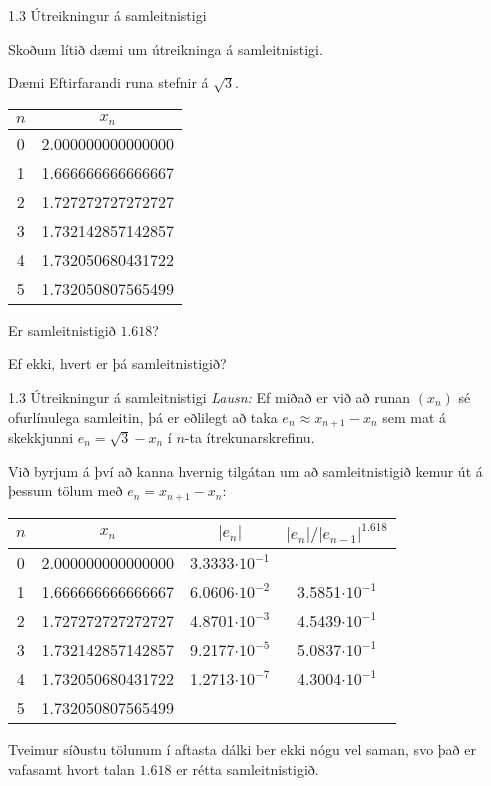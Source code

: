 \begin{frame}{1.3 Útreikningur á samleitnistigi} 

Skoðum lítið dæmi um útreikninga á samleitnistigi. 

\begin{block}{Dæmi}
Eftirfarandi runa stefnir á  $\sqrt 3$. 
\begin{center}
	\begin{tabular}{c|c|}
		$n$ & $x_n$ \\ \hline
		0&  2.000000000000000 \\
		1&  1.666666666666667 \\
		2&  1.727272727272727 \\
		3&  1.732142857142857 \\
		4&  1.732050680431722 \\
		5&  1.732050807565499 \\
	\end{tabular}
\end{center}
\pause

Er samleitnistigið $1.618$?

Ef ekki, hvert er þá samleitnistigið?
\end{block}
\end{frame}
%

%
\begin{frame}{1.3 Útreikningur á samleitnistigi} 
{\it Lausn:} Ef miðað er við að  runan $(x_n)$ sé  ofurlínulega
samleitin, þá er eðlilegt að taka $e_n\approx x_{n+1}-x_n$ sem mat á
skekkjunni $e_n=\sqrt 3-x_n$ í $n$-ta  
ítrekunarskrefinu. 

\pause

\smallskip
Við byrjum á því að kanna hvernig tilgátan
um að samleitnistigið kemur út á þessum tölum með $e_n=x_{n+1}-x_n$:
\begin{center}
\begin{tabular}{c|c|c|c|}
$n$ & $x_n$ & $|e_n|$ & $|e_n|/|e_{n-1}|^{1.618}$  \\ \hline
0&  2.000000000000000 & 3.3333$\cdot 10^{-1}$ & \\
1&  1.666666666666667 & 6.0606$\cdot 10^{-2}$ & 3.5851$\cdot 10^{-1}$\\
2&  1.727272727272727 & 4.8701$\cdot 10^{-3}$ & 4.5439$\cdot 10^{-1}$\\
3&  1.732142857142857 & 9.2177$\cdot 10^{-5}$ & 5.0837$\cdot 10^{-1}$\\
4&  1.732050680431722 & 1.2713$\cdot 10^{-7}$ & 4.3004$\cdot 10^{-1}$\\
5&  1.732050807565499 & & \\
\end{tabular}
\end{center}\pause
Tveimur síðustu tölunum í aftasta dálki ber ekki nógu vel saman, svo
það er vafasamt hvort talan $1.618$ er rétta
samleitnistigið. 
\end{frame}
%

